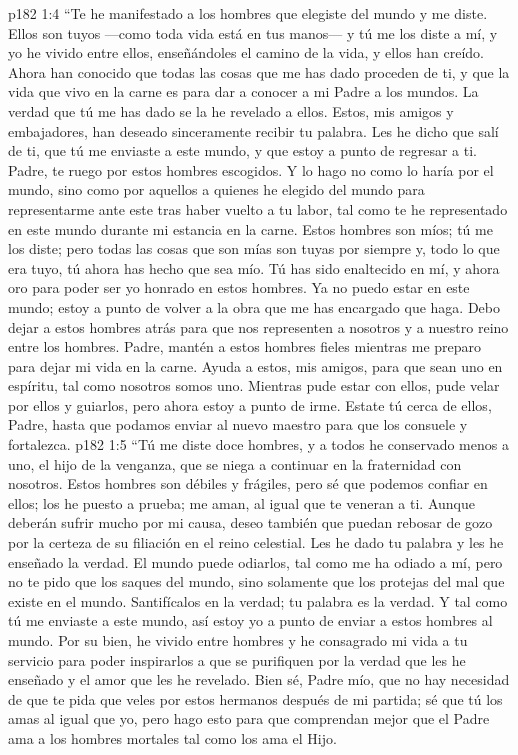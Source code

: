 \vs p182 1:4 “Te he manifestado a los hombres que elegiste del mundo y me diste. Ellos son tuyos ---como toda vida está en tus manos--- y tú me los diste a mí, y yo he vivido entre ellos, enseñándoles el camino de la vida, y ellos han creído. Ahora han conocido que todas las cosas que me has dado proceden de ti, y que la vida que vivo en la carne es para dar a conocer a mi Padre a los mundos. La verdad que tú me has dado se la he revelado a ellos. Estos, mis amigos y embajadores, han deseado sinceramente recibir tu palabra. Les he dicho que salí de ti, que tú me enviaste a este mundo, y que estoy a punto de regresar a ti. Padre, te ruego por estos hombres escogidos. Y lo hago no como lo haría por el mundo, sino como por aquellos a quienes he elegido del mundo para representarme ante este tras haber vuelto a tu labor, tal como te he representado en este mundo durante mi estancia en la carne. Estos hombres son míos; tú me los diste; pero todas las cosas que son mías son tuyas por siempre y, todo lo que era tuyo, tú ahora has hecho que sea mío. Tú has sido enaltecido en mí, y ahora oro para poder ser yo honrado en estos hombres. Ya no puedo estar en este mundo; estoy a punto de volver a la obra que me has encargado que haga. Debo dejar a estos hombres atrás para que nos representen a nosotros y a nuestro reino entre los hombres. Padre, mantén a estos hombres fieles mientras me preparo para dejar mi vida en la carne. Ayuda a estos, mis amigos, para que sean uno en espíritu, tal como nosotros somos uno. Mientras pude estar con ellos, pude velar por ellos y guiarlos, pero ahora estoy a punto de irme. Estate tú cerca de ellos, Padre, hasta que podamos enviar al nuevo maestro para que los consuele y fortalezca.
\vs p182 1:5 “Tú me diste doce hombres, y a todos he conservado menos a uno, el hijo de la venganza, que se niega a continuar en la fraternidad con nosotros. Estos hombres son débiles y frágiles, pero sé que podemos confiar en ellos; los he puesto a prueba; me aman, al igual que te veneran a ti. Aunque deberán sufrir mucho por mi causa, deseo también que puedan rebosar de gozo por la certeza de su filiación en el reino celestial. Les he dado tu palabra y les he enseñado la verdad. El mundo puede odiarlos, tal como me ha odiado a mí, pero no te pido que los saques del mundo, sino solamente que los protejas del mal que existe en el mundo. Santifícalos en la verdad; tu palabra es la verdad. Y tal como tú me enviaste a este mundo, así estoy yo a punto de enviar a estos hombres al mundo. Por su bien, he vivido entre hombres y he consagrado mi vida a tu servicio para poder inspirarlos a que se purifiquen por la verdad que les he enseñado y el amor que les he revelado. Bien sé, Padre mío, que no hay necesidad de que te pida que veles por estos hermanos después de mi partida; sé que tú los amas al igual que yo, pero hago esto para que comprendan mejor que el Padre ama a los hombres mortales tal como los ama el Hijo.

